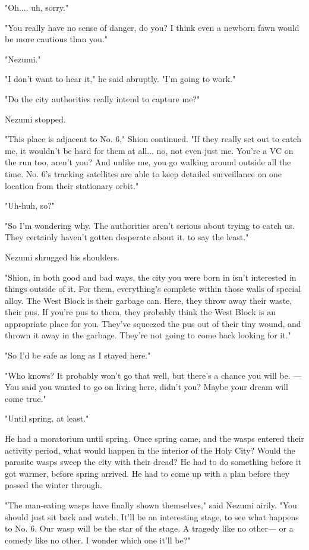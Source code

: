 "Oh.... uh, sorry."

"You really have no sense of danger, do you? I think even a newborn fawn
would be more cautious than you."

"Nezumi."

"I don't want to hear it," he said abruptly. "I'm going to work."

"Do the city authorities really intend to capture me?"

Nezumi stopped.

"This place is adjacent to No. 6," Shion continued. "If they really set
out to catch me, it wouldn't be hard for them at all... no, not even
just me. You're a VC on the run too, aren't you? And unlike me, you go
walking around outside all the time. No. 6's tracking satellites are
able to keep detailed surveillance on one location from their stationary
orbit."

"Uh-huh, so?"

"So I'm wondering why. The authorities aren't serious about trying to
catch us. They certainly haven't gotten desperate about it, to say the
least."

Nezumi shrugged his shoulders.

"Shion, in both good and bad ways, the city you were born in isn't
interested in things outside of it. For them, everything's complete
within those walls of special alloy. The West Block is their garbage
can. Here, they throw away their waste, their pus. If you're pus to
them, they probably think the West Block is an appropriate place for
you. They've squeezed the pus out of their tiny wound, and thrown it
away in the garbage. They're not going to come back looking for it."

"So I'd be safe as long as I stayed here."

"Who knows? It probably won't go that well, but there's a chance you
will be. ---You said you wanted to go on living here, didn't you? Maybe
your dream will come true."

"Until spring, at least."

He had a moratorium until spring. Once spring came, and the wasps
entered their activity period, what would happen in the interior of the
Holy City? Would the parasite wasps sweep the city with their dread? He
had to do something before it got warmer, before spring arrived. He had
to come up with a plan before they passed the winter through.

"The man-eating wasps have finally shown themselves," said Nezumi
airily. "You should just sit back and watch. It'll be an interesting
stage, to see what happens to No. 6. Our wasp will be the star of the
stage. A tragedy like no other--- or a comedy like no other. I wonder
which one it'll be?"

